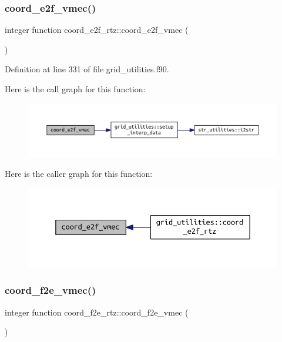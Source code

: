 \subsubsection{\texorpdfstring{coord\+\_\+e2f\+\_\+vmec()}{coord\_e2f\_vmec()}}
{\footnotesize\ttfamily integer function coord\+\_\+e2f\+\_\+rtz\+::coord\+\_\+e2f\+\_\+vmec (\begin{DoxyParamCaption}{ }\end{DoxyParamCaption})}



Definition at line 331 of file grid\+\_\+utilities.\+f90.

Here is the call graph for this function\+:
\nopagebreak
\begin{figure}[H]
\begin{center}
\leavevmode
\includegraphics[width=350pt]{grid__utilities_8f90_af4a8f2c9e0c72e80e6cbac35617e5f80_cgraph}
\end{center}
\end{figure}
Here is the caller graph for this function\+:
\nopagebreak
\begin{figure}[H]
\begin{center}
\leavevmode
\includegraphics[width=350pt]{grid__utilities_8f90_af4a8f2c9e0c72e80e6cbac35617e5f80_icgraph}
\end{center}
\end{figure}
\mbox{\label{grid__utilities_8f90_aa4643f558c5d0e6149c4a8cbd289777d}} 
\subsubsection{\texorpdfstring{coord\+\_\+f2e\+\_\+vmec()}{coord\_f2e\_vmec()}}
{\footnotesize\ttfamily integer function coord\+\_\+f2e\+\_\+rtz\+::coord\+\_\+f2e\+\_\+vmec (\begin{DoxyParamCaption}{ }\end{DoxyParamCaption})}



